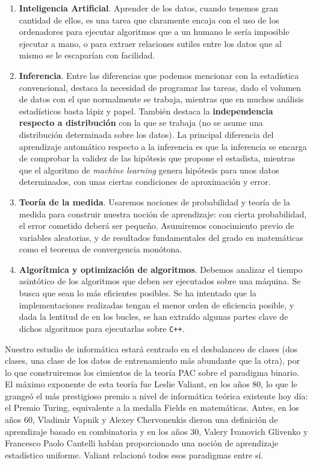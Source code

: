 \begin{enumerate}[i]
\item \textbf{Inteligencia Artificial}. Aprender de los datos, cuando tenemos gran cantidad de ellos, es una tarea que 
claramente encaja con el uso de los ordenadores para ejecutar algoritmos que a un humano le sería imposible ejecutar a mano, o para
extraer relaciones sutiles entre los datos que al mismo se le escaparían con facilidad.

\item \textbf{Inferencia}. Entre las diferencias que podemos mencionar con la estadística convencional, destaca 
la necesidad de programar las tareas, dado el volumen de datos con el que normalmente se trabaja, mientras que en muchos análisis 
estadísticos basta lápiz y papel. También destaca la \textbf{independencia respecto a distribución} con la que se trabaja (no se
asume una distribución determinada sobre los datos). La principal diferencia del aprendizaje automático respecto a la inferencia 
es que la inferencia se encarga de comprobar la validez de las hipótesis que propone el estadista, mientras que el algoritmo de
\textit{machine learning} genera hipótesis para unos datos determinados, con unas ciertas condiciones de aproximación y error.

\item \textbf{Teoría de la medida}. Usaremos nociones de probabilidad y teoría de la medida para construir nuestra noción de 
aprendizaje: con cierta probabilidad, el error cometido deberá ser pequeño. Asumiremos conocimiento previo de variables 
aleatorias, y de resultados fundamentales del grado en matemáticas como el teorema de convergencia monótona.

\item \textbf{Algorítmica y optimización de algoritmos}. Debemos analizar el tiempo asintótico de los algoritmos que deben ser ejecutados
sobre una máquina. Se busca que sean lo más eficientes posibles. Se ha intentado que la implementaciones realizadas 
tengan el menor orden de eficiencia posible, y dada la lentitud de \R en los bucles, se han extraído algunas partes clave de dichos 
algoritmos para ejecutarlas sobre \texttt{C++}.
\end{enumerate}

Nuestro estudio de informática estará centrado en el desbalanceo de clases (dos clases, una clase de los datos de entrenamiento más 
abundante que la otra), por lo que construiremos los cimientos de la teoría PAC sobre el paradigma binario. El máximo exponente
de esta teoría fue Leslie Valiant, en los años 80, lo que le grangeó el más prestigioso premio a nivel de informática teórica
existente hoy día: el Premio Turing, equivalente a la medalla Fields en matemáticas. Antes, en los años 60, Vladimir Vapnik y 
Alexey Chervonenkis dieron una definición de aprendizaje basado en combinatoria y en los años 30, Valery Ivanovich Glivenko y Francesco
Paolo Cantelli habían proporcionado una noción de aprendizaje estadístico uniforme. Valiant relacionó todos esos paradigmas
entre sí.

